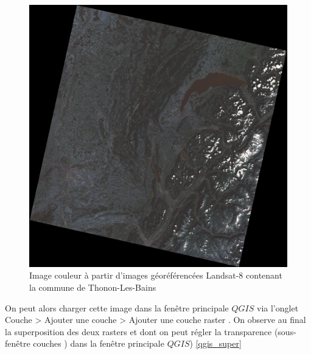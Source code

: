 \documentclass{book}
\begin{document}
\begin{figure}[H]
\begin{center}
\includegraphics[scale=0.4]{images/georeferencing/Thonon_landsat.png}
\end{center}
\caption{Image couleur à partir d'images géoréférencées Landsat-8 contenant la commune de Thonon-Les-Bains}
\label{Thonon-landsat}
\end{figure}

On peut alors charger cette image dans la fenêtre principale $QGIS$ via l'onglet \og Couche > Ajouter une couche > Ajouter une couche 
raster \fg{}. On observe au final la superposition des deux rasters et dont on peut régler la transparence (sous-fen\^{e}tre \og couches \fg{}) 
dans la fen\^{e}tre principale $QGIS$) \ref{qgis_super}
\end{document}
